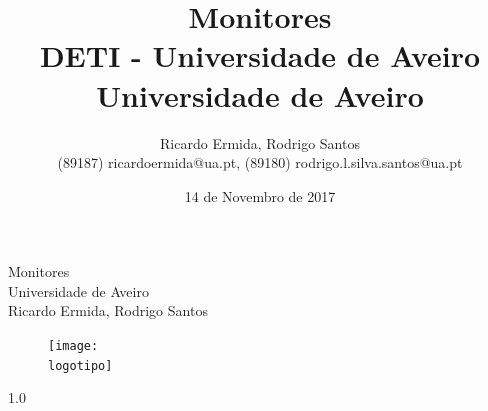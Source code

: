 \documentclass[a4paper]{report}
\begin{document}
%
\def\titulo{Monitores}
\def\data{14 de Novembro de 2017}
\def\autores{Ricardo Ermida, Rodrigo Santos}
\def\autorescontactos{(89187) ricardoermida@ua.pt, (89180) rodrigo.l.silva.santos@ua.pt}
\def\versao{1.0}
\def\departamento{DETI - Universidade de Aveiro}
\def\empresa{Universidade de Aveiro}
\def\logotipo{ua.pdf}
%
%
\begin{titlepage}

\begin{center}
%
\vspace*{50mm}
%
{\Huge \titulo}\\ 
%
\vspace{10mm}
%
{\Large \empresa}\\
%
\vspace{10mm}
%
{\LARGE \autores}\\ 
%
\vspace{30mm}
%
\begin{figure}[h]
\center
\texttt{[image: \\logotipo]}
\end{figure}
%
\vspace{30mm}
\end{center}
%
\begin{flushright}
\versao
\end{flushright}
\end{titlepage}

\title{%
{\Huge\textbf{\titulo}}\\
{\Large \departamento\\ \empresa}
}
%
\author{%
    \autores \\
    \autorescontactos
}
%
\date{\data}
%
\maketitle

\end{document}
